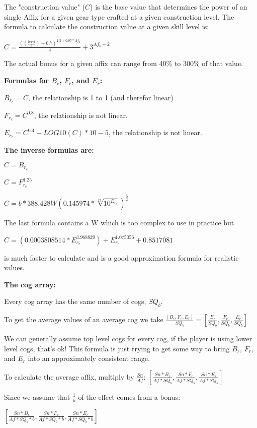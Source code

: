 \documentclass[12pt, letterpaper]{article}
\begin{document}
The "construction value" ($C$) is the base value that determines the power of an single Affix for a given gear type crafted at a given construction level. The formula to calculate the construction value at a given skill level is:

$C=\frac{\left(\left(\frac{level}{3}\right)+0.7\right)^{1.3+0.05*Af_b}}{4} + 3^{Af_b-2}$

The actual bonus for a given affix can range from 40\% to 300\% of that value.

\textbf{Formulas for $B_r$, $F_r$, and $E_r$:}

$B_{r_c} = C$, the relationship is 1 to 1 (and therefor linear)

$F_{r_c} = C^{0.8}$, the relationship is not linear.

$E_{r_c} = C^{0.4}+LOG10(C)*10-5$, the relationship is not linear.

\textbf{The inverse formulas are:}

$C = B_{r_c}$

$C = F_{r_c}^{1.25}$

$C = b*388.428W\left(0.145974*\sqrt[25]{10^{E_{r_c}}}\right)^{\frac{5}{2}}$

The last formula contains a W which is too complex to use in practice but

$C = (0.0003808514*E_{r_c}^{3.968829})+E_{r_c}^{1.075056}+0.8517081$

is much faster to calculate and is a good approximation formula for realistic values.

\textbf{The cog array:}

Every cog array has the same number of cogs, $SQ_b$.

To get the average values of an average cog we take  $\frac{[B_r,F_r,E_r]}{SQ_b}=\left[\frac{B_r}{SQ_b},\frac{F_r}{SQ_b},\frac{E_r}{SQ_b}\right]$

We can generally assume top level cogs for every cog, if the player is using lower level cogs, that's ok! This formula is just trying to get some way to bring $B_r$, $F_r$, and $E_r$ into an approximately consistent range.

To calculate the average affix, multiply by $\frac{Sn}{Af}$: $\left[\frac{Sn*B_r}{Af*SQ_b},\frac{Sn*F_r}{Af*SQ_b},\frac{Sn*E_r}{Af*SQ_b}\right]$

Since we assume that $\frac{1}{b}$ of the effect comes from a bonus:

$\left[\frac{Sn*B_r}{Af*SQ_b*b},\frac{Sn*F_r}{Af*SQ_b*b},\frac{Sn*E_r}{Af*SQ_b*b}\right]$
\end{document}
